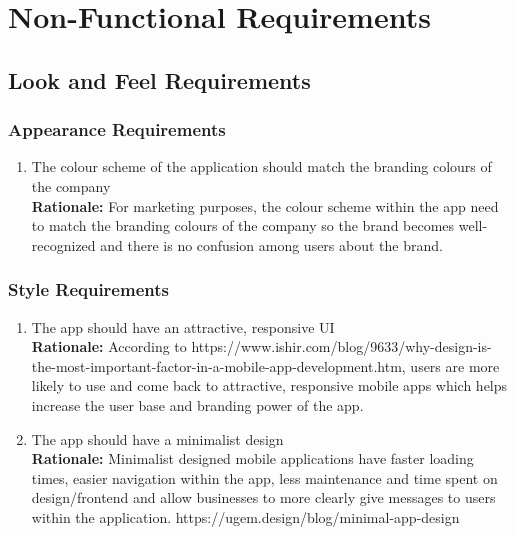 \documentclass[]{article}
\begin{document}

\section{Non-Functional Requirements}
\label{sec:non-functional_requirements}

\subsection{Look and Feel Requirements}
\label{sub:look_and_feel_requirements}

\subsubsection{Appearance Requirements}
\label{ssub:appearance_requirements}
\begin{enumerate}[{LF-A}1. ]
	\item The colour scheme of the application should match the branding colours of the company \\
	{\bf Rationale:} For marketing purposes, the colour scheme within the app need to match the branding colours of the company so the brand becomes well-recognized and there is no confusion among users about the brand.
\end{enumerate}

\subsubsection{Style Requirements}
\label{ssub:style_requirements}
\begin{enumerate}[{LF-S}1. ]
	\item The app should have an attractive, responsive UI \\
	{\bf Rationale:} According to https://www.ishir.com/blog/9633/why-design-is-the-most-important-factor-in-a-mobile-app-development.htm, users are more likely to use and come back to attractive, responsive mobile apps which helps increase the user base and branding power of the app. 
	\item The app should have a minimalist design \\
	{\bf Rationale:} Minimalist designed mobile applications have faster loading times, easier navigation within the app, less maintenance and time spent on design/frontend and allow businesses to more clearly give messages to users within the application. https://ugem.design/blog/minimal-app-design
\end{enumerate}
\end{document}
